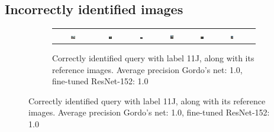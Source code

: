 \subsection{Incorrectly identified images}\label{sec:incorrectimages}
\begin{figure}
\centering
\begin{subfigure}{\textwidth}
\begin{tabular}{|c|*{6}{c}}
\includegraphics[width=0.12\textwidth]{img/11J-0521.JPG} &
\includegraphics[width=0.12\textwidth]{img/11J-0.JPG} &
\includegraphics[width=0.12\textwidth]{img/11J-1.JPG} &
\includegraphics[width=0.12\textwidth]{img/11J-2.JPG} &
\includegraphics[width=0.12\textwidth]{img/11J-3.JPG} &
\includegraphics[width=0.12\textwidth]{img/11J-4.JPG} \\
\end{tabular}
\caption{Correctly identified query with label 11J,
along with its reference images.\newline
Average precision Gordo's net: 1.0, fine-tuned ResNet-152: 1.0
\label{fig:correct11J}}
\end{subfigure}


\end{figure}
